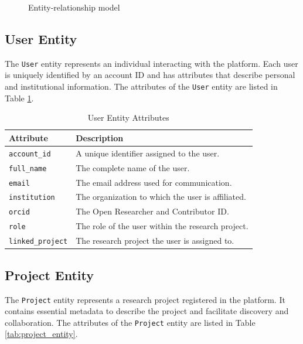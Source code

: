 \documentclass[final]{rc-book-2.14}
\begin{document}
\begin{figure}[htbp]
    \caption{Entity-relationship model}
    \label{fig:er_model}
\end{figure}



\subsection{User Entity}
The \texttt{User} entity represents an individual interacting with the platform. Each user is uniquely identified by an account ID and has attributes that describe personal and institutional information. The attributes of the \texttt{User} entity are listed in Table \ref{tab:user_entity}.

\begin{table}[h]
    \centering
    \renewcommand{\arraystretch}{1.2}
    \caption{User Entity Attributes}
    \label{tab:user_entity}
    \begin{tabularx}{\textwidth}{|l|X|}
        \hline
        \textbf{Attribute}       & \textbf{Description}                              \\ \hline
        \texttt{account\_id}     & A unique identifier assigned to the user.         \\ \hline
        \texttt{full\_name}      & The complete name of the user.                    \\ \hline
        \texttt{email}           & The email address used for communication.         \\ \hline
        \texttt{institution}     & The organization to which the user is affiliated. \\ \hline
        \texttt{orcid}           & The Open Researcher and Contributor ID.           \\ \hline
        \texttt{role}            & The role of the user within the research project. \\ \hline
        \texttt{linked\_project} & The research project the user is assigned to.     \\ \hline
    \end{tabularx}
\end{table}


\subsection{Project Entity}
The \texttt{Project} entity represents a research project registered in the platform. It contains essential metadata to describe the project and facilitate discovery and collaboration. The attributes of the \texttt{Project} entity are listed in Table \ref{tab:project_entity}.
\end{document}
